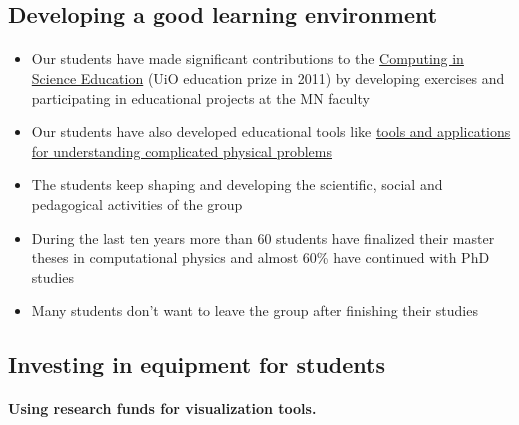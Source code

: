 \documentclass[%
oneside,                 %
final,                   %
10pt]{article}
\begin{document}
\noindent




\subsection*{Developing a good learning environment}

\paragraph{}
\begin{itemize}
\item Our students have made significant contributions to  the \href{{http://www.mn.uio.no/english/about/collaboration/cse/}}{Computing in Science Education}  (UiO education prize in 2011) by developing exercises and participating in educational projects at the MN faculty

\item Our students have also developed educational tools like \href{{http://www.mn.uio.no/fysikk/om/aktuelt/aktuelle-saker/2015/realfagsapper.html}}{tools and applications for understanding complicated physical problems} 

\item The students keep shaping and developing the scientific, social and pedagogical activities of the group

\item During the last ten years more than 60 students have finalized their master theses in computational physics and  almost 60\% have continued with PhD studies

\item Many students don't want to leave the group after finishing their studies
\end{itemize}

\noindent






\subsection*{Investing in equipment for students}

\paragraph{Using research funds for visualization tools.}
\end{document}
